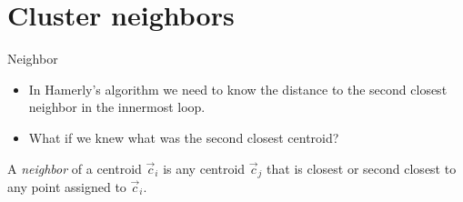 \documentclass[10pt, compress]{beamer}
\newcommand{\cj}{\vec{c}_j}
\newcommand{\ci}{\vec{c}_i}
\newcommand{\movcj}{\| \cj - \cj' \|}
\newcommand{\mci}{m(\ci)}
\begin{document}


\section{Cluster neighbors}

\begin{frame}{Neighbor}
  \begin{itemize}
    \item In Hamerly's algorithm we need to know the distance to the second closest neighbor in the innermost loop.
    \item What if we knew what was the second closest centroid?
  \end{itemize}
  \begin{definition}
    A \emph{neighbor} of a centroid $\ci$ is any centroid $\cj$
    that is closest or second closest to any point assigned to $\ci$.
  \end{definition}
\end{frame}
\end{document}
